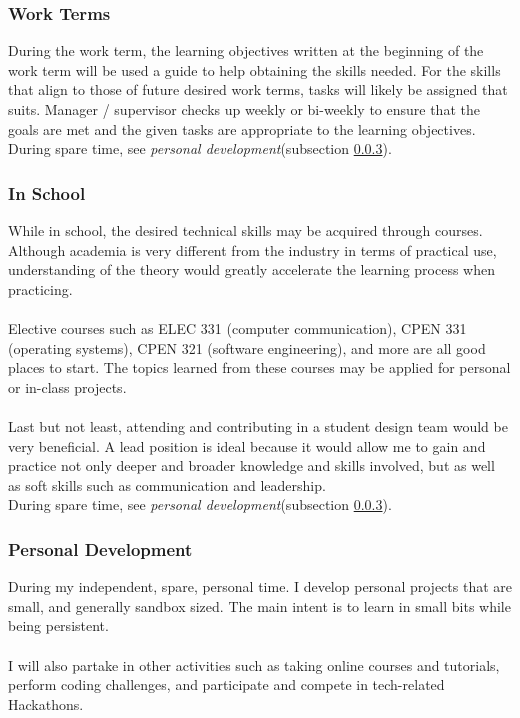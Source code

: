 \documentclass[10pt,letterpaper]{article}
\begin{document}
\subsubsection{Work Terms}

During the work term, the learning objectives written at the beginning of the work term will be used a guide to help obtaining the skills needed. For the skills that align to those of future desired work terms, tasks will likely be assigned that suits. Manager / supervisor checks up weekly or bi-weekly to ensure that the goals are met and the given tasks are appropriate to the learning objectives.\\

During spare time, see \textit{personal development}(subsection \ref{personal-development}).\\

\subsubsection{In School}
While in school, the desired technical skills may be acquired through courses. Although academia is very different from the industry in terms of practical use, understanding of the theory would greatly accelerate the learning process when practicing.\\
\\
Elective courses such as ELEC 331 (computer communication), CPEN 331 (operating systems), CPEN 321 (software engineering), and more are all good places to start. The topics learned from these courses may be applied for personal or in-class projects.\\
\\
Last but not least, attending and contributing in a student design team would be very beneficial. A lead position is ideal because it would allow me to gain and practice not only deeper and broader knowledge and skills involved, but as well as soft skills such as communication and leadership.\\

During spare time, see \textit{personal development}(subsection \ref{personal-development}).\\

\subsubsection{Personal Development}\label{personal-development}
During my independent, spare, personal time. I develop personal projects that are small, and generally sandbox sized. The main intent is to learn in small bits while being persistent.\\
\\
I will also partake in other activities such as taking online courses and tutorials, perform coding challenges, and participate and compete in tech-related Hackathons.\\
\end{document}
